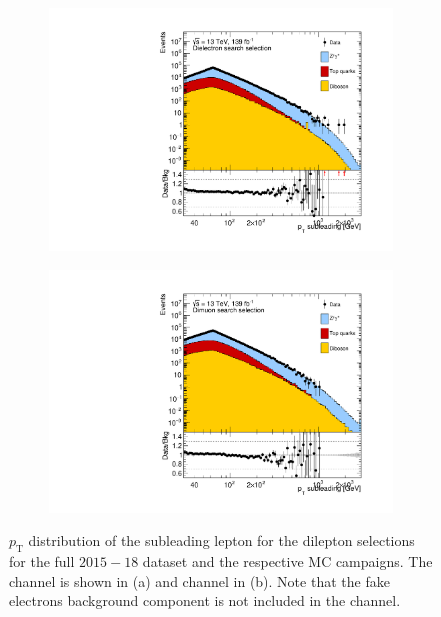 \begin{figure}[]
    \centering
    \begin{subfigure}[b]{0.49\textwidth}
        \centering
        \includegraphics[width=\textwidth]{figures/analysis/datamc/dataMCcompare/ee_pt2_log100.pdf}
        \caption{}
        \label{fig:datamc:eept2}
    \end{subfigure}
    \begin{subfigure}[b]{0.49\textwidth}
        \centering
        \includegraphics[width=\textwidth]{figures/analysis/datamc/dataMCcompare/uu_pt2_log100.pdf}
        \caption{}
        \label{fig:datamc:uupt2}
    \end{subfigure}
    \caption[$p_\mathrm{T}$ distribution of the subleading lepton for the dilepton selections for the full $2015-18$ dataset and the respective MC campaigns.]{$p_\mathrm{T}$ distribution of the subleading lepton for the dilepton selections for the full $2015-18$ dataset and the respective MC campaigns. The \ee channel is shown in (a) and \mumu channel in (b). Note that the fake electrons background component is not included in the \ee channel.}
    \label{fig:datamc:pt2}
\end{figure}

